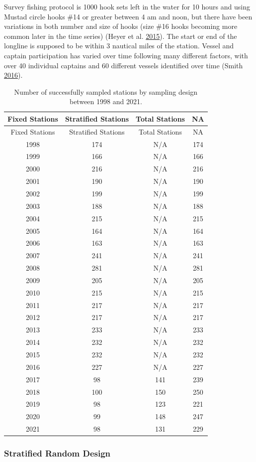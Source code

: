 \documentclass[12pt]{article}\usepackage[]{graphicx}\usepackage[]{color}
\begin{document}
Survey fishing protocol is 1000 hook sets left in the water for 10 hours and using Mustad circle hooks \#14 or greater between 4 am and noon, but there have been variations in both number and size of hooks (size \#16 hooks becoming more common later in the time series) (Heyer et al. \protect\hyperlink{ref-DenHeyer2015}{2015}). The start or end of the longline is supposed to be within 3 nautical miles of the station. Vessel and captain participation has varied over time following many different factors, with over 40 individual captains and 60 different vessels identified over time (Smith \protect\hyperlink{ref-Smith2016a}{2016}).
\begin{longtable}[]{@{}cccc@{}}
\caption{\label{tab:stat-samp}Number of successfully sampled stations by sampling design between 1998 and 2021.}\tabularnewline
\toprule
Fixed Stations & Stratified Stations & Total Stations & NA\tabularnewline
\midrule
\endfirsthead
\toprule
Fixed Stations & Stratified Stations & Total Stations & NA\tabularnewline
\midrule
\endhead
1998 & 174 & N/A & 174\tabularnewline
1999 & 166 & N/A & 166\tabularnewline
2000 & 216 & N/A & 216\tabularnewline
2001 & 190 & N/A & 190\tabularnewline
2002 & 199 & N/A & 199\tabularnewline
2003 & 188 & N/A & 188\tabularnewline
2004 & 215 & N/A & 215\tabularnewline
2005 & 164 & N/A & 164\tabularnewline
2006 & 163 & N/A & 163\tabularnewline
2007 & 241 & N/A & 241\tabularnewline
2008 & 281 & N/A & 281\tabularnewline
2009 & 205 & N/A & 205\tabularnewline
2010 & 215 & N/A & 215\tabularnewline
2011 & 217 & N/A & 217\tabularnewline
2012 & 217 & N/A & 217\tabularnewline
2013 & 233 & N/A & 233\tabularnewline
2014 & 232 & N/A & 232\tabularnewline
2015 & 232 & N/A & 232\tabularnewline
2016 & 227 & N/A & 227\tabularnewline
2017 & 98 & 141 & 239\tabularnewline
2018 & 100 & 150 & 250\tabularnewline
2019 & 98 & 123 & 221\tabularnewline
2020 & 99 & 148 & 247\tabularnewline
2021 & 98 & 131 & 229\tabularnewline
\bottomrule
\end{longtable}
\hypertarget{stratified-random-design}{%
\subsubsection{Stratified Random Design}\label{stratified-random-design}}
\end{document}
